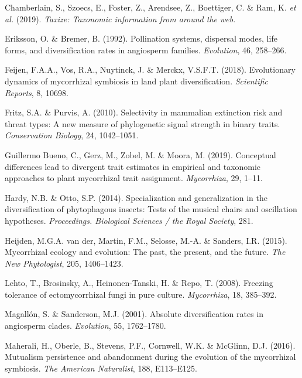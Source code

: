 \documentclass[12pt,]{article}
\begin{document}
\leavevmode\hypertarget{ref-chamberlain_2019}{}%
Chamberlain, S., Szoecs, E., Foster, Z., Arendsee, Z., Boettiger, C. \&
Ram, K. \emph{et al.} (2019). \emph{Taxize: Taxonomic information from
around the web}.

\leavevmode\hypertarget{ref-eriksson_1992}{}%
Eriksson, O. \& Bremer, B. (1992). Pollination systems, dispersal modes,
life forms, and diversification rates in angiosperm families.
\emph{Evolution}, 46, 258--266.

\leavevmode\hypertarget{ref-feijen_2018}{}%
Feijen, F.A.A., Vos, R.A., Nuytinck, J. \& Merckx, V.S.F.T. (2018).
Evolutionary dynamics of mycorrhizal symbiosis in land plant
diversification. \emph{Scientific Reports}, 8, 10698.

\leavevmode\hypertarget{ref-fritz_2010}{}%
Fritz, S.A. \& Purvis, A. (2010). Selectivity in mammalian extinction
risk and threat types: A new measure of phylogenetic signal strength in
binary traits. \emph{Conservation Biology}, 24, 1042--1051.

\leavevmode\hypertarget{ref-guillermobueno_2019}{}%
Guillermo Bueno, C., Gerz, M., Zobel, M. \& Moora, M. (2019). Conceptual
differences lead to divergent trait estimates in empirical and taxonomic
approaches to plant mycorrhizal trait assignment. \emph{Mycorrhiza}, 29,
1--11.

\leavevmode\hypertarget{ref-hardy_2014}{}%
Hardy, N.B. \& Otto, S.P. (2014). Specialization and generalization in
the diversification of phytophagous insects: Tests of the musical chairs
and oscillation hypotheses. \emph{Proceedings. Biological Sciences / the
Royal Society}, 281.

\leavevmode\hypertarget{ref-vanderheijden_2015}{}%
Heijden, M.G.A. van der, Martin, F.M., Selosse, M.-A. \& Sanders, I.R.
(2015). Mycorrhizal ecology and evolution: The past, the present, and
the future. \emph{The New Phytologist}, 205, 1406--1423.

\leavevmode\hypertarget{ref-lehto_2008}{}%
Lehto, T., Brosinsky, A., Heinonen-Tanski, H. \& Repo, T. (2008).
Freezing tolerance of ectomycorrhizal fungi in pure culture.
\emph{Mycorrhiza}, 18, 385--392.

\leavevmode\hypertarget{ref-magalln_2001}{}%
Magallón, S. \& Sanderson, M.J. (2001). Absolute diversification rates
in angiosperm clades. \emph{Evolution}, 55, 1762--1780.

\leavevmode\hypertarget{ref-maherali_2016}{}%
Maherali, H., Oberle, B., Stevens, P.F., Cornwell, W.K. \& McGlinn, D.J.
(2016). Mutualism persistence and abandonment during the evolution of
the mycorrhizal symbiosis. \emph{The American Naturalist}, 188,
E113--E125.
\end{document}
